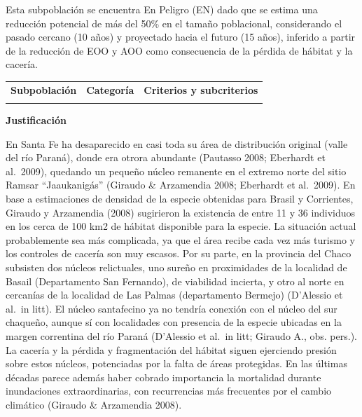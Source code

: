 \documentclass[
  x11names]{article}
\begin{document}
Esta subpoblación se encuentra En Peligro (EN) dado que se estima una
reducción potencial de más del 50\% en el tamaño poblacional,
considerando el pasado cercano (10 años) y proyectado hacia el futuro
(15 años), inferido a partir de la reducción de EOO y AOO como
consecuencia de la pérdida de hábitat y la cacería.\vspace{0.5cm}

\begin{tabu} to 
\toprule
\textbf{Subpoblación} & \textbf{Categoría} & \textbf{Criterios y subcriterios}\\
\midrule
{} &  & \\
\bottomrule
\end{tabu}

\textbf{Justificación}

En Santa Fe ha desaparecido en casi toda su área de distribución
original (valle del río Paraná), donde era otrora abundante (Pautasso
2008; Eberhardt et al.~2009), quedando un pequeño núcleo remanente en el
extremo norte del sitio Ramsar ``Jaaukanigás'' (Giraudo \& Arzamendia
2008; Eberhardt et al.~2009). En base a estimaciones de densidad de la
especie obtenidas para Brasil y Corrientes, Giraudo y Arzamendia (2008)
sugirieron la existencia de entre 11 y 36 individuos en los cerca de 100
km2 de hábitat disponible para la especie. La situación actual
probablemente sea más complicada, ya que el área recibe cada vez más
turismo y los controles de cacería son muy escasos. Por su parte, en la
provincia del Chaco subsisten dos núcleos relictuales, uno sureño en
proximidades de la localidad de Basail (Departamento San Fernando), de
viabilidad incierta, y otro al norte en cercanías de la localidad de Las
Palmas (departamento Bermejo) (D'Alessio et al.~in litt). El núcleo
santafecino ya no tendría conexión con el núcleo del sur chaqueño,
aunque sí con localidades con presencia de la especie ubicadas en la
margen correntina del río Paraná (D'Alessio et al.~in litt; Giraudo A.,
obs. pers.). La cacería y la pérdida y fragmentación del hábitat siguen
ejerciendo presión sobre estos núcleos, potenciadas por la falta de
áreas protegidas. En las últimas décadas parece además haber cobrado
importancia la mortalidad durante inundaciones extraordinarias, con
recurrencias más frecuentes por el cambio climático (Giraudo \&
Arzamendia 2008).
\end{document}
